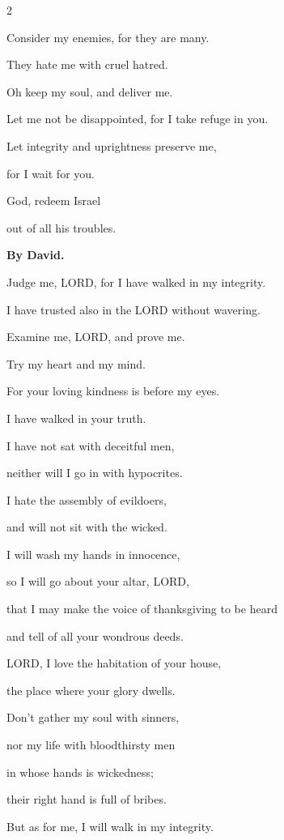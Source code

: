 \begin{multicols}{2}
	
	\myverse{}Consider my enemies, for they are many.
	
	They hate me with cruel hatred.
	
	
	\myverse{}Oh keep my soul, and deliver me.
	
	Let me not be disappointed, for I take refuge in you.
	
	
	\myverse{}Let integrity and uprightness preserve me,
	
	for I wait for you.
	
	
	\myverse{}God, redeem Israel
	
	out of all his troubles.
	
	
	\mychapter{}\textbf{By David.}
	
	\quad \myverse*{}Judge me, LORD, for I have walked in my integrity.
	
	I have trusted also in the LORD without wavering.
	
	
	\myverse{}Examine me, LORD, and prove me.
	
	Try my heart and my mind.
	
	
	\myverse{}For your loving kindness is before my eyes.
	
	I have walked in your truth.
	
	
	\myverse{}I have not sat with deceitful men,
	
	neither will I go in with hypocrites.
	
	
	\myverse{}I hate the assembly of evildoers,
	
	and will not sit with the wicked.
	
	
	\myverse{}I will wash my hands in innocence,
	
	so I will go about your altar, LORD,
	
	
	\myverse{}that I may make the voice of thanksgiving to be heard
	
	and tell of all your wondrous deeds.
	
	
	\myverse{}LORD, I love the habitation of your house,
	
	the place where your glory dwells.
	
	
	\myverse{}Don’t gather my soul with sinners,
	
	nor my life with bloodthirsty men
	
	
	\myverse{}in whose hands is wickedness;
	
	their right hand is full of bribes.
	
	\vspace{\baselineskip}
	
	\myverse{}But as for me, I will walk in my integrity.
	

\end{multicols}
